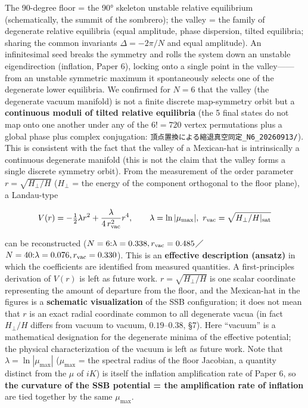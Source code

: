 \documentclass[
  a4paper,
]{ltjsarticle}
\begin{document}
The 90-degree floor = the 90° skeleton unstable relative equilibrium
(schematically, the summit of the sombrero); the valley = the family of
degenerate relative equilibria (equal amplitude, phase dispersion,
tilted equilibria; sharing the common invariants \(\Delta=-2\pi/N\) and
equal amplitude). An infinitesimal seed breaks the symmetry and rolls
the system down an unstable eigendirection (inflation, Paper 6), locking
onto a single point in the valley------from an unstable symmetric
maximum it spontaneously selects one of the degenerate lower equilibria.
We confirmed for \(N=6\) that the valley (the degenerate vacuum
manifold) is not a finite discrete map-symmetry orbit but a
\textbf{continuous moduli of tilted relative equilibria} (the 5 final
states do not map onto one another under any of the \(6!=720\) vertex
permutations plus a global phase plus complex conjugation:
\texttt{頂点置換による縮退真空同定\_N6\_20260913/}). This is consistent
with the fact that the valley of a Mexican-hat is intrinsically a
continuous degenerate manifold (this is not the claim that the valley
forms a single discrete symmetry orbit). From the measurement of the
order parameter \(r=\sqrt{H_\perp/H}\) (\(H_\perp\) = the energy of the
component orthogonal to the floor plane), a Landau-type

\[V(r)=-\tfrac12\lambda r^2+\frac{\lambda}{4\,r_{\rm vac}^2}r^4,\qquad \lambda=\ln|\mu_{\max}|,\ r_{\rm vac}=\sqrt{H_\perp/H|_{\rm sat}}\]

can be reconstructed
(\(N=6{:}\lambda=0.338,r_{\rm vac}=0.485\)／\(N=40{:}\lambda=0.076,r_{\rm vac}=0.330\)).
This is an \textbf{effective description (ansatz)} in which the
coefficients are identified from measured quantities. A first-principles
derivation of \(V(r)\) is left as future work. \(r=\sqrt{H_\perp/H}\) is
one scalar coordinate representing the amount of departure from the
floor, and the Mexican-hat in the figures is a \textbf{schematic
visualization} of the SSB configuration; it does not mean that \(r\) is
an exact radial coordinate common to all degenerate vacua (in fact
\(H_\perp/H\) differs from vacuum to vacuum, \(0.19\)--\(0.38\), §7).
Here ``vacuum'' is a mathematical designation for the degenerate minima
of the effective potential; the physical characterization of the vacuum
is left as future work. Note that \(\lambda=\ln|\mu_{\max}|\)
(\(\mu_{\max}\) = the spectral radius of the floor Jacobian, a quantity
distinct from the \(\mu\) of \(iK\)) is itself the inflation
amplification rate of Paper 6, so \textbf{the curvature of the SSB
potential = the amplification rate of inflation} are tied together by
the same \(\mu_{\max}\).
\end{document}
